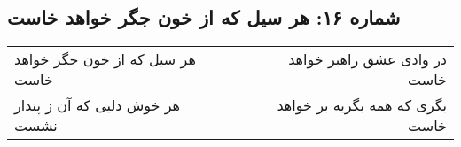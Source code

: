 \begin{center}
\section*{شماره ۱۶: هر سیل که از خون جگر خواهد خاست}
\label{sec:016}
\begin{longtable}{l p{0.5cm} r}
هر سیل که از خون جگر خواهد خاست
&&
در وادی عشق راهبر خواهد خاست
\\
هر خوش دلیی که آن ز پندار نشست
&&
بگری که همه بگریه بر خواهد خاست
\\
\end{longtable}
\end{center}

